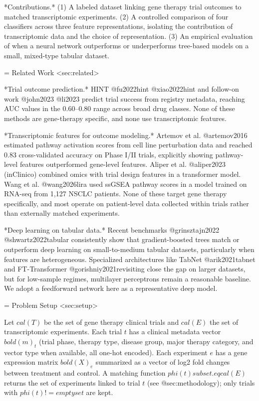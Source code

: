 *Contributions.* (1) A labeled dataset linking gene therapy trial outcomes to matched transcriptomic experiments. (2) A controlled comparison of four classifiers across three feature representations, isolating the contribution of transcriptomic data and the choice of representation. (3) An empirical evaluation of when a neural network outperforms or underperforms tree-based models on a small, mixed-type tabular dataset.


= Related Work <sec:related>

*Trial outcome prediction.* HINT @fu2022hint @xiao2022hint and follow-on work @john2023 @li2023 predict trial success from registry metadata, reaching AUC values in the 0.60--0.80 range across broad drug classes. None of these methods are gene-therapy specific, and none use transcriptomic features.

*Transcriptomic features for outcome modeling.* Artemov et al. @artemov2016 estimated pathway activation scores from cell line perturbation data and reached 0.83 cross-validated accuracy on Phase I/II trials, explicitly showing pathway-level features outperformed gene-level features. Aliper et al. @aliper2023 (inClinico) combined omics with trial design features in a transformer model. Wang et al. @wang2026lira used ssGSEA pathway scores in a model trained on RNA-seq from 1,127 NSCLC patients. None of these target gene therapy specifically, and most operate on patient-level data collected within trials rather than externally matched experiments.

*Deep learning on tabular data.* Recent benchmarks @grinsztajn2022 @shwartz2022tabular consistently show that gradient-boosted trees match or outperform deep learning on small-to-medium tabular datasets, particularly when features are heterogeneous. Specialized architectures like TabNet @arik2021tabnet and FT-Transformer @gorishniy2021revisiting close the gap on larger datasets, but for low-sample regimes, multilayer perceptrons remain a reasonable baseline. We adopt a feedforward network here as a representative deep model.


= Problem Setup <sec:setup>

Let $cal(T)$ be the set of gene therapy clinical trials and $cal(E)$ the set of transcriptomic experiments. Each trial $t$ has a clinical metadata vector $bold(m)_t$ (trial phase, therapy type, disease group, major therapy category, and vector type when available, all one-hot encoded). Each experiment $e$ has a gene expression matrix $bold(X)_e$ summarized as a vector of log2 fold changes between treatment and control. A matching function $phi(t) subset.eq cal(E)$ returns the set of experiments linked to trial $t$ (see @sec:methodology); only trials with $phi(t) != emptyset$ are kept.


